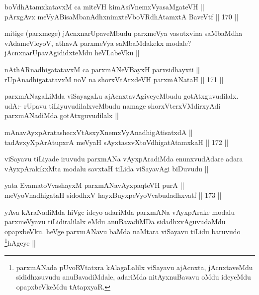 \begin{shl}
boVdhAtamxkatavxM ca miteVH kimAsiVnemxVyasaMgateVH || \\
pArxgAvx meVyABisaMbanAdhxnimxteVboVRdhAtamxtA BaveVtf ||  170 ||  
\end{shl}

\begin{artha}
mitige (parxmege) jAcnxnarUpaveMbudu parxmeVya vasutxvina saMbaMdha vAdameVleyoV, athavA parxmeVya saMbaMdakekx modale? jAcnxnarUpavAgididxteMdu heVLabeVku ||
\end{artha}


\begin{shl}
nAthARnadhigatatavxM ca parxmANeVBayxH parxsidhayxti || \\
rUpAnadhigatatavxM noV na shorxVtArxdeVH parxmANataH ||  171 ||  
\end{shl}

\begin{artha}
parxmANagaLiMda viSayagaLu ajAcnxtavAgiveyeMbudu gotAtxguvudilalx. udA:- rUpavu tiLiyuvudilalxveMbudu namage shorxVterxVMdirxyAdi parxmANadiMda gotAtxguvudilalx ||
\end{artha}

\begin{shl}
mAnavAyxpAratashecxVtAsxyXnemxVyAnadhigAtisatxdA ||  \\
tadAvxyXpArAtupxrA meVyaH sAyxtasxvXtoVdhigatAtamxkaH ||  172 ||  
\end{shl}

\begin{artha}
viSayavu tiLiyade iruvudu parxmANa vAyxpAradiMda enunxvudAdare adara vAyxpArakikxMta modalu savxtaH tiLida viSayavAgi biDuvudu ||
\end{artha}

\begin{shl}
yata EvamatoV\s vashayxM parxmANavAyxpaqteVH purA || \\
meVyoV\s nadhigataH sidodhxV hayxBuyxpeVyoV\s vabudadhxvatf ||  173 ||  
\end{shl}

\begin{artha}
yAva kAraNadiMda hiVge ideyo adariMda parxmANa vAyxpArake modalu parxmeVyavu tiLidiralilalx eMdu anuBavadiMDa sidadhxvAguvudaMdu opapxbeVku. heVge parxmANavu baMda naMtara viSayavu tiLidu baruvudo \footnote{parxmANada pUvoRVtatxra kAlagaLalilx viSayavu ajAcnxta, jAcnxtaveMdu sididhxsuvudu anuBavadiMdale, adariMda nitAyxnuBavavu oMdu ideyeMdu opapxbeVkeMdu tAtapxyaR.}hAgeye ||
\end{artha}

